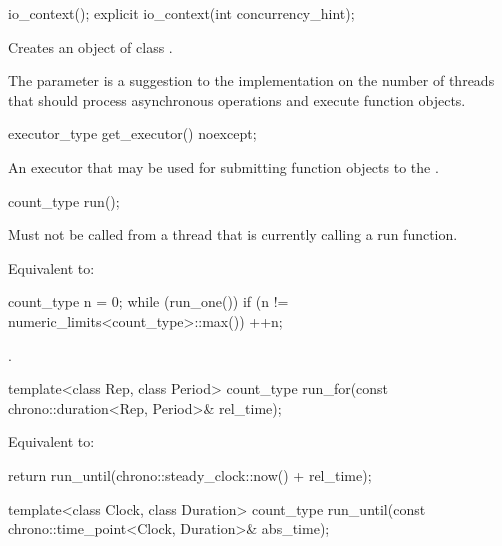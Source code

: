 \begin{itemdecl}
io_context();
explicit io_context(int concurrency_hint);
\end{itemdecl}

\begin{itemdescr}
\pnum
\effects Creates an object of class .

\pnum
\remarks The  parameter is a suggestion to the implementation on the number of threads that should process asynchronous operations and execute function objects.
\end{itemdescr}

\begin{itemdecl}
executor_type get_executor() noexcept;
\end{itemdecl}

\begin{itemdescr}
\pnum
\returns An executor that may be used for submitting function objects to the .
\end{itemdescr}

\begin{itemdecl}
count_type run();
\end{itemdecl}

\begin{itemdescr}
\pnum
\requires Must not be called from a thread that is currently calling a run function.

\pnum
\effects Equivalent to: 
\begin{codeblock}
count_type n = 0;
while (run_one())
  if (n != numeric_limits<count_type>::max())
    ++n;
\end{codeblock}


\pnum
\returns {}.
\end{itemdescr}

\begin{itemdecl}
template<class Rep, class Period>
  count_type run_for(const chrono::duration<Rep, Period>& rel_time);
\end{itemdecl}

\begin{itemdescr}
\pnum
\effects Equivalent to: 
\begin{codeblock}
return run_until(chrono::steady_clock::now() + rel_time);
\end{codeblock}

\end{itemdescr}

\begin{itemdecl}
template<class Clock, class Duration>
  count_type run_until(const chrono::time_point<Clock, Duration>& abs_time);
\end{itemdecl}

